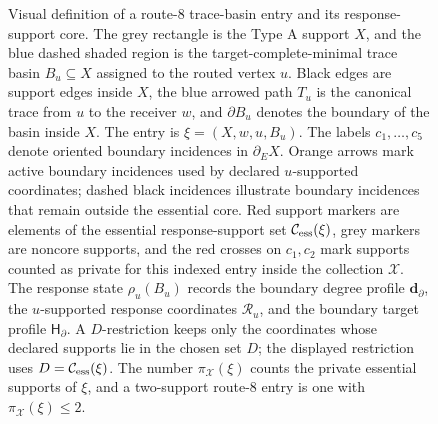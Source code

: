 \documentclass[11pt]{article}
\newcommand{\profile}{\mathsf H}
\begin{document}
\begin{figure}[t]
{%
}
\caption[Visual definition of a route-8 trace-basin entry]{Visual definition of a route-8 trace-basin entry and its response-support core.  The grey rectangle is the Type A support $X$, and the blue dashed shaded region is the target-complete-minimal trace basin $B_u\subseteq X$ assigned to the routed vertex $u$.  Black edges are support edges inside \(X\), the blue arrowed path $T_u$ is the canonical trace from $u$ to the receiver $w$, and $\partial B_u$ denotes the boundary of the basin inside $X$.  The entry is $\xi=(X,w,u,B_u)$.  The labels $c_1,\ldots,c_5$ denote oriented boundary incidences in $\partial_E X$.  Orange arrows mark active boundary incidences used by declared $u$-supported coordinates; dashed black incidences illustrate boundary incidences that remain outside the essential core.  Red support markers are elements of the essential response-support set $\mathcal C_{\rm ess}(\xi)$, grey markers are noncore supports, and the red crosses on $c_1,c_2$ mark supports counted as private for this indexed entry inside the collection $\mathcal X$.  The response state $\rho_u(B_u)$ records the boundary degree profile $\mathbf d_\partial$, the $u$-supported response coordinates $\mathcal R_u$, and the boundary target profile $\profile_\partial$.  A $D$-restriction keeps only the coordinates whose declared supports lie in the chosen set $D$; the displayed restriction uses $D=\mathcal C_{\rm ess}(\xi)$.  The number $\pi_{\mathcal X}(\xi)$ counts the private essential supports of $\xi$, and a two-support route-8 entry is one with $\pi_{\mathcal X}(\xi)\le2$.}
\label{fig:typeA-route8-carrier-gadget}
\end{figure}
\end{document}
